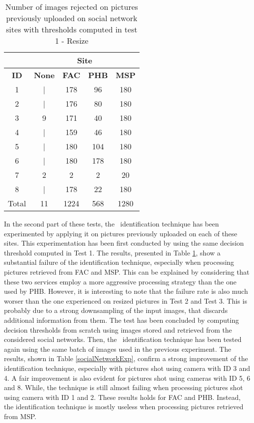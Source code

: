
\begin{table}[bht]
\centering
\caption{Number of images rejected on pictures previously uploaded on social network sites with thresholds computed in test 1 - Resize}
\begin{tabular}{  |c  | c | c |  c | c   |} 
\hline
& \multicolumn{4}{|c|}{ \textbf{Site}} \\ \hline
{\textbf{ID}}& \textbf{None} & \textbf{FAC} & \textbf{PHB} & \textbf{MSP} \\ \hline
1 		& | 	& 178 	& 96 		& 180	 \\
2 		& | 	& 176	& 80 		& 180 	 \\
3 		& 9 	& 171 	& 40 		& 180 	 \\
4 		& | 	& 159 	& 46 		& 180 	 \\
5 		& | 	& 180 	& 104 	& 180	 \\
6 		& | 	& 180 	& 178 	& 180 	\\
7 		& 2	& 2 		& 2 		& 20 	 \\
8 		& | 	& 178 	& 22 		& 180 	 \\ \hline \hline
{Total} 	& 11	& 1224	& 568	& 1280 	\\
\hline
\end{tabular}
\label{tableExp4}
\end{table}


In the second part of these tests, the \Lukas\ identification technique has been experimented by applying it on pictures previously uploaded on each of these sites. This experimentation has been first conducted by using the same decision threshold computed in Test 1. The results, presented in Table \ref{tableExp4}, show a substantial failure of the identification technique, especially when processing pictures retrieved from FAC and MSP. This can be explained by considering that these two services employ a more aggressive processing strategy than the one used by PHB. However, it is interesting to note that the failure rate is also much worser than the one experienced on resized pictures in Test 2 and Test 3. This is probably due to a strong downsampling of the input images, that discards additional information from them. The test has been concluded by computing decision thresholds from scratch using images stored and retrieved from the considered social networks. Then, the  \Lukas\ identification technique has been tested again using the same batch of images used in the previous experiment.  The results, shown in Table \ref{socialNetworkExp}, confirm a strong improvement of the identification technique, especially with pictures shot using camera with ID 3 and 4. A fair improvement is also evident for pictures shot using cameras with ID 5, 6 and 8. While, the technique is still almost failing when processing pictures shot using camera with ID 1 and 2. These results holds for FAC and PHB. Instead, the identification technique is mostly useless when processing pictures retrieved from MSP. 


